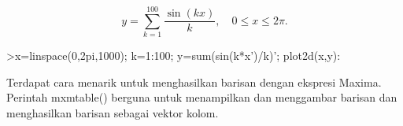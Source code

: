 \documentclass[a4paper,10pt]{article}
\begin{document}
\begin{eulernotebook}
\begin{eulercomment}
\begin{eulercomment}
\begin{eulercomment}
\begin{eulercomment}
\begin{eulercomment}
\begin{eulercomment}
\begin{eulercomment}
\end{eulercomment}
\begin{eulerformula}
\[
y = \sum_{k=1}^{100} \dfrac{\sin(kx)}{k},\quad 0\le x\le 2\pi.
\]
\end{eulerformula}
\begin{eulercomment}
\end{eulercomment}
\begin{eulerprompt}
>x=linspace(0,2pi,1000); k=1:100; y=sum(sin(k*x')/k)'; plot2d(x,y):
\end{eulerprompt}
\begin{eulercomment}
Terdapat cara menarik untuk menghasilkan barisan dengan ekspresi Maxima. Perintah
mxmtable() berguna untuk menampilkan dan menggambar barisan dan menghasilkan barisan sebagai
vektor kolom. 


\end{eulercomment}
\end{eulercomment}
\end{eulercomment}
\end{eulercomment}
\end{eulercomment}
\end{eulercomment}
\end{eulercomment}
\end{eulernotebook}
\end{document}
